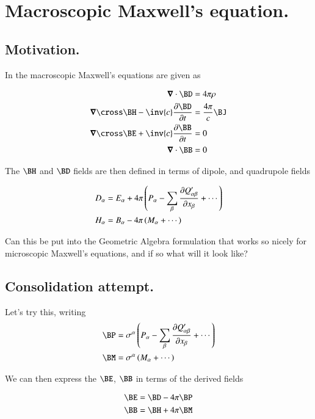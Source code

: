 \chapter{Macroscopic Maxwell's equation.}
\label{chap:macroscopicMaxwell}
\date{May 28, 2009.  macroscopicMaxwell.tex}

\section{Motivation. }

In \citep{jackson1975cew} the macroscopic Maxwell's equations are given as

\begin{align}\label{eqn:macroMax:MaxwellMixedFields}
\spacegrad \cdot \BD &= 4 \pi \rho \\
\spacegrad \cross \BH - \inv{c} \PD{t}{\BD} &= \frac{4 \pi}{c} \BJ \\
\spacegrad \cross \BE + \inv{c} \PD{t}{\BB} &= 0 \\
\spacegrad \cdot \BB &= 0
\end{align}

The $\BH$ and $\BD$ fields are then defined in terms of dipole, and quadrupole
fields

\begin{align}\label{eqn:macroMax:dipoleCoordinates}
D_\alpha &= E_\alpha + 4\pi \left( P_\alpha - \sum_\beta \PD{x_\beta}{Q'_{\alpha\beta}} + \cdots\right) \\
H_\alpha &= B_\alpha - 4\pi \left( M_\alpha + \cdots\right)
\end{align}

Can this be put into the Geometric Algebra formulation that works so
nicely for microscopic Maxwell's equations, and if so what will it look like?

\section{Consolidation attempt. }

Let's try this, writing
\begin{align}
\BP &= \sigma^\alpha \left( P_\alpha - \sum_\beta \PD{x_\beta}{Q'_{\alpha\beta}} + \cdots\right) \\
\BM &= \sigma^\alpha \left( M_\alpha + \cdots \right)
\end{align}

We can then express the $\BE$, $\BB$ in terms of the derived fields

\begin{align}
\BE &= \BD - 4\pi \BP \\
\BB &= \BH + 4\pi \BM
\end{align}

